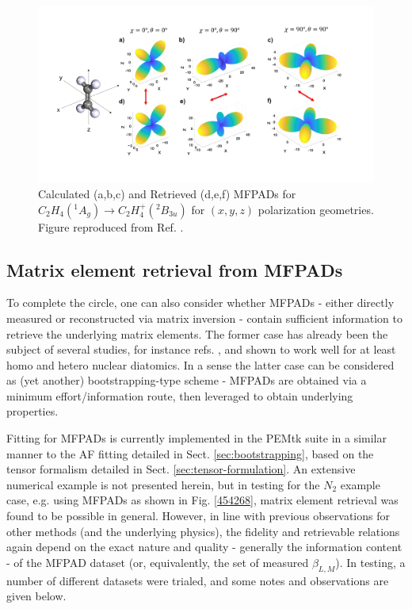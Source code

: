 \documentclass[10pt]{article}
\begin{document}
\begin{figure}[]
\begin{center}
\includegraphics[width=\textwidth,height=\dimexpr\textheight-4\baselineskip-\abovecaptionskip-\belowcaptionskip\relax,keepaspectratio]{figures/D2h1.png}
\caption{Calculated (a,b,c) and Retrieved (d,e,f) MFPADs for \(C_2 H_4(^1A_g) \rightarrow C_2H_4^+(^2B_{3u})\) for \((x,y,z)\) polarization geometries. Figure reproduced from Ref. \cite{gregory2021MolecularFramePhotoelectron}.\label{584598}}
\end{center}
\end{figure}

\subsection{Matrix element retrieval from MFPADs\label{sec:recon-from-MFPADs}}

To complete the circle, one can also consider whether MFPADs - either directly measured or reconstructed via matrix inversion - contain sufficient information to retrieve the underlying matrix elements.  The former case has already been the subject of several studies, for instance refs. \cite{Gessner2002a,Lebech2003,Cherepkov2005, Yagishita2005}, and shown to work well for at least homo and hetero nuclear diatomics. In a sense the latter case can be considered as (yet another) bootstrapping-type scheme - MFPADs are obtained via a minimum effort/information route, then leveraged to obtain underlying properties. 

Fitting for MFPADs is currently implemented in the PEMtk suite in a similar manner to the AF fitting detailed in Sect. \ref{sec:bootstrapping}, based on the tensor formalism detailed in Sect. \ref{sec:tensor-formulation}. An extensive numerical example is not presented herein, but in testing for the $N_{2}$ example case, e.g. using MFPADs as shown in Fig. \ref{454268}, matrix element retrieval was found to be possible in general. However, in line with previous observations for other methods (and the underlying physics), the fidelity and retrievable relations again depend on the exact nature and quality - generally the information content - of the MFPAD dataset (or, equivalently, the set of measured $\beta_{L,M}$). In testing, a number of different datasets were trialed, and some notes and observations are given below.
\end{document}
